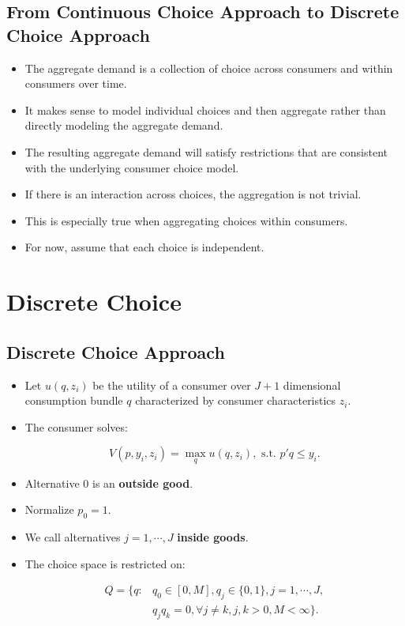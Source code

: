 \documentclass[]{book}
\providecommand{\tightlist}{%
  \setlength{\itemsep}{0pt}\setlength{\parskip}{0pt}}
\begin{document}
\subsection{From Continuous Choice Approach to Discrete Choice
Approach}\label{from-continuous-choice-approach-to-discrete-choice-approach}

\begin{itemize}
\tightlist
\item
  The aggregate demand is a collection of choice across consumers and
  within consumers over time.
\item
  It makes sense to model individual choices and then aggregate rather
  than directly modeling the aggregate demand.
\item
  The resulting aggregate demand will satisfy restrictions that are
  consistent with the underlying consumer choice model.
\item
  If there is an interaction across choices, the aggregation is not
  trivial.
\item
  This is especially true when aggregating choices within consumers.
\item
  For now, assume that each choice is independent.
\end{itemize}

\section{Discrete Choice}\label{discrete-choice}

\subsection{Discrete Choice Approach}\label{discrete-choice-approach}

\begin{itemize}
\tightlist
\item
  Let \(u(q, z_i)\) be the utility of a consumer over \(J + 1\)
  dimensional consumption bundle \(q\) characterized by consumer
  characteristics \(z_i\).
\item
  The consumer solves:

  \begin{equation}
  V(p, y_i, z_i) = \max_{q}u(q, z_i), \text{   s.t.   } p'q \le y_i.
  \end{equation}
\item
  Alternative \(0\) is an \textbf{outside good}.
\item
  Normalize \(p_0 = 1\).
\item
  We call alternatives \(j = 1, \cdots, J\) \textbf{inside goods}.
\item
  The choice space is restricted on:

  \begin{equation}
  \begin{split}
  Q = \{q:& q_0 \in [0, M], q_j \in \{0, 1\}, j = 1, \cdots, J,\\
  & q_j q_k = 0, \forall j \neq k, j, k > 0, M < \infty\}.
  \end{split}
  \end{equation}
\end{itemize}
\end{document}
